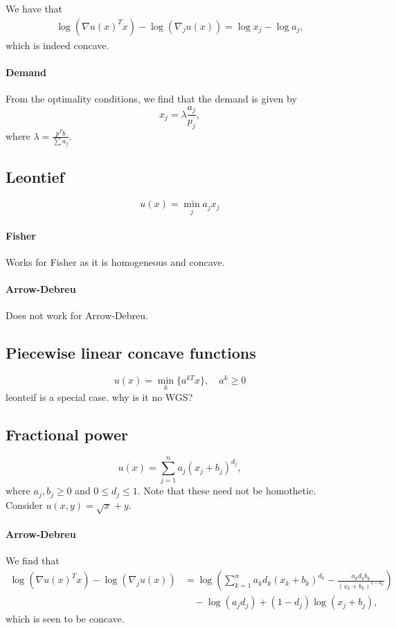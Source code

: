 \documentclass[12pt]{article}
\begin{document}
We have that
\begin{align*}
\log(\nabla u(x)^T x) - \log(\nabla_j u(x)) =
\log x_j - \log a_j,
\end{align*}
which is indeed concave.

\paragraph{Demand}
From the optimality conditions, we find that the demand is given by
\[
x_j = \lambda \frac{a_j}{p_j},
\]
where $\lambda = \frac{p^Tb}{\sum a_j}$.

\subsection{Leontief}
\[
u(x) = \min_j a_j x_j
\]

\paragraph{Fisher}
Works for Fisher as it is homogeneous and concave.

\paragraph{Arrow-Debreu}
Does not work for Arrow-Debreu.

\subsection{Piecewise linear concave functions}
\[
u(x) = \min_k\lbrace a^{kT}x \rbrace,\quad a^k \geq 0
\]
leonteif is a special case. why is it no WGS?

\subsection{Fractional power}
 \[
 u(x) = \sum_{j=1}^n a_j (x_j+ b_j)^{d_j},
 \]
 where $a_j, b_j \geq 0$ and $0 \leq d_j \leq 1$.
 Note that these need not be homothetic. Consider $u(x,y) = \sqrt{x} + y$.

 \paragraph{Arrow-Debreu}
We find that 
\begin{align*}
\log(\nabla u(x)^T x) - \log(\nabla_j u(x))
&= \log\left(\sum_{k=1}^n a_k d_k (x_k+b_k)^{d_k} - \frac{a_k d_k b_k}{(x_k + b_k)^{1-d_k}} \right)\\
&\quad- \log(a_j d_j) + (1-d_j)\log (x_j + b_j),
\end{align*}
which is seen to be concave.
\end{document}
